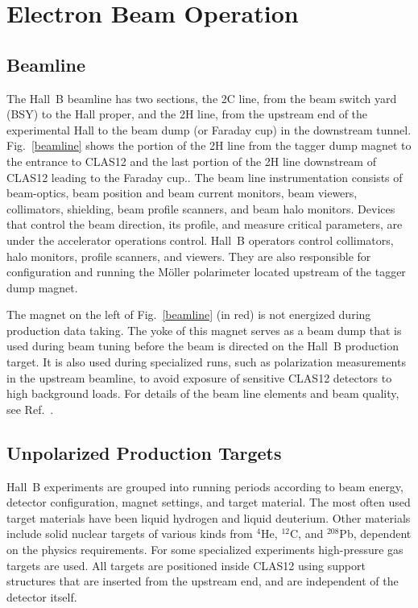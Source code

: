 \documentclass[final,3p,twocolumn]{elsarticle}
\begin{document}
 



\section{Electron Beam Operation} 

\subsection{Beamline}

The Hall~B beamline has two sections, the 2C line, from the beam switch yard (BSY) to the Hall proper, and the 2H
line, from the upstream end of the experimental Hall to the beam dump (or Faraday cup) in the downstream tunnel.
Fig.~\ref{beamline} shows the portion of the 2H line from the tagger dump magnet to the entrance to
CLAS12 and the last portion of the 2H line downstream of CLAS12 leading to
the Faraday cup.. The beam line instrumentation consists of beam-optics, beam position and beam current monitors,
beam viewers, collimators,  shielding, beam profile scanners, and beam halo monitors. Devices that control the beam
direction, its profile, and  measure critical parameters, are under the accelerator operations control. Hall~B operators
control collimators, halo monitors, profile scanners, and viewers. They are also responsible for configuration and
running the M\"oller polarimeter located upstream of the tagger dump magnet.

The magnet on the left of Fig.~\ref{beamline} (in red) is not energized during production data taking. The
yoke of this magnet serves as a beam dump that is used during beam tuning before the beam is directed on the Hall~B
production target. It is also used during specialized runs, such as polarization measurements in the upstream beamline,
to avoid exposure of sensitive CLAS12 detectors to high background loads. For details of the beam line elements and
beam quality, see Ref.~\cite{beamline}.  
 
\subsection{Unpolarized Production Targets} 

Hall~B experiments are grouped into running periods according to beam energy, detector configuration, magnet
settings, and target material. The most often used target materials have been liquid hydrogen and liquid deuterium.
Other materials include solid nuclear targets of various kinds from $^4$He, $^{12}$C, and $^{208}$Pb, dependent on
the physics requirements. For some specialized experiments high-pressure gas targets are used. All targets are 
positioned inside CLAS12 using support structures that are inserted from
the upstream end, and are independent of the detector itself. 
\end{document}
